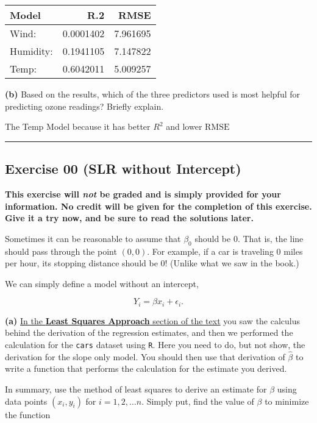 \documentclass[]{article}
\begin{document}
\begin{longtable}[]{@{}lrr@{}}
\toprule
Model & R.2 & RMSE\tabularnewline
\midrule
\endhead
Wind: & 0.0001402 & 7.961695\tabularnewline
Humidity: & 0.1941105 & 7.147822\tabularnewline
Temp: & 0.6042011 & 5.009257\tabularnewline
\bottomrule
\end{longtable}

\textbf{(b)} Based on the results, which of the three predictors used is
most helpful for predicting ozone readings? Briefly explain.

The Temp Model because it has better \(R^2\) and lower \(\text{RMSE}\)

\begin{center}\rule{0.5\linewidth}{0.5pt}\end{center}

\hypertarget{exercise-00-slr-without-intercept}{%
\subsection{Exercise 00 (SLR without
Intercept)}\label{exercise-00-slr-without-intercept}}

\textbf{This exercise will \emph{not} be graded and is simply provided
for your information. No credit will be given for the completion of this
exercise. Give it a try now, and be sure to read the solutions later.}

Sometimes it can be reasonable to assume that \(\beta_0\) should be 0.
That is, the line should pass through the point \((0, 0)\). For example,
if a car is traveling 0 miles per hour, its stopping distance should be
0! (Unlike what we saw in the book.)

We can simply define a model without an intercept,

\[
Y_i = \beta x_i + \epsilon_i.
\]

\textbf{(a)}
\href{http://daviddalpiaz.github.io/appliedstats/simple-linear-regression.html\#least-squares-approach}{In
the \textbf{Least Squares Approach} section of the text} you saw the
calculus behind the derivation of the regression estimates, and then we
performed the calculation for the \texttt{cars} dataset using
\texttt{R}. Here you need to do, but not show, the derivation for the
slope only model. You should then use that derivation of \(\hat{\beta}\)
to write a function that performs the calculation for the estimate you
derived.

In summary, use the method of least squares to derive an estimate for
\(\beta\) using data points \((x_i, y_i)\) for \(i = 1, 2, \ldots n\).
Simply put, find the value of \(\beta\) to minimize the function
\end{document}
